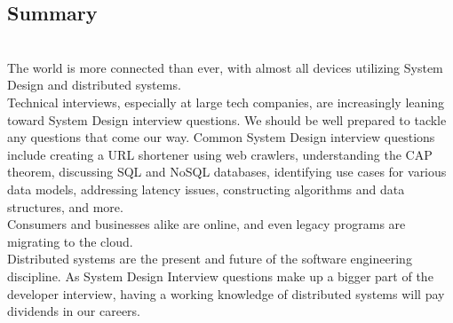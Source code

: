 \subsection{Summary}\label{vYe5Uua6uuB405yTeeTW_}
\\
The world is more connected than ever, with almost all devices utilizing System Design and distributed systems.
\\
Technical interviews, especially at large tech companies, are increasingly leaning toward System Design interview questions. We should be well prepared to tackle any questions that come our way. Common System Design interview questions include creating a URL shortener using web crawlers, understanding the CAP theorem, discussing SQL and NoSQL databases, identifying use cases for various data models, addressing latency issues, constructing algorithms and data structures, and more.
\\
Consumers and businesses alike are online, and even legacy programs are migrating to the cloud.
\\
Distributed systems are the present and future of the software engineering discipline. As System Design Interview questions make up a bigger part of the developer interview, having a working knowledge of distributed systems will pay dividends in our careers.


